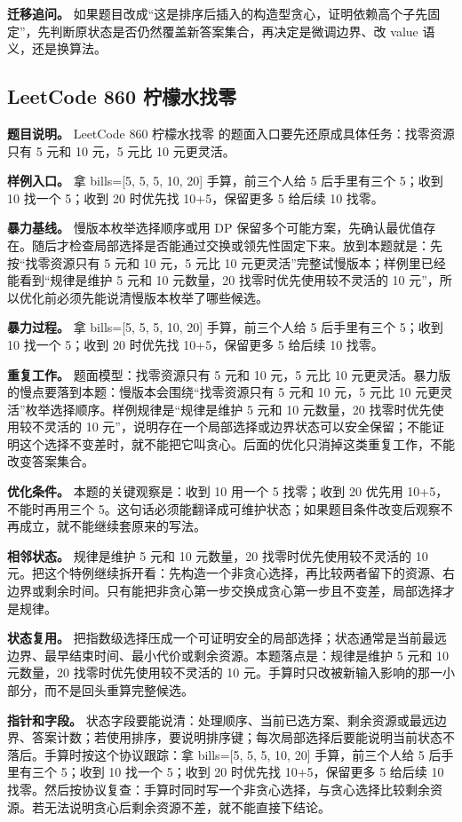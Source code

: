 \textbf{迁移追问。} 如果题目改成“这是排序后插入的构造型贪心，证明依赖高个子先固定”，先判断原状态是否仍然覆盖新答案集合，再决定是微调边界、改 value 语义，还是换算法。

\subsection{LeetCode 860 柠檬水找零}

\textbf{题目说明。} LeetCode 860 柠檬水找零 的题面入口要先还原成具体任务：找零资源只有 5 元和 10 元，5 元比 10 元更灵活。

\textbf{样例入口。} 拿 bills=[5, 5, 5, 10, 20] 手算，前三个人给 5 后手里有三个 5；收到 10 找一个 5；收到 20 时优先找 10+5，保留更多 5 给后续 10 找零。

\textbf{暴力基线。} 慢版本枚举选择顺序或用 DP 保留多个可能方案，先确认最优值存在。随后才检查局部选择是否能通过交换或领先性固定下来。放到本题就是：先按“找零资源只有 5 元和 10 元，5 元比 10 元更灵活”完整试慢版本；样例里已经能看到“规律是维护 5 元和 10 元数量，20 找零时优先使用较不灵活的 10 元”，所以优化前必须先能说清慢版本枚举了哪些候选。

\textbf{暴力过程。} 拿 bills=[5, 5, 5, 10, 20] 手算，前三个人给 5 后手里有三个 5；收到 10 找一个 5；收到 20 时优先找 10+5，保留更多 5 给后续 10 找零。

\textbf{重复工作。} 题面模型：找零资源只有 5 元和 10 元，5 元比 10 元更灵活。暴力版的慢点要落到本题：慢版本会围绕“找零资源只有 5 元和 10 元，5 元比 10 元更灵活”枚举选择顺序。样例规律是“规律是维护 5 元和 10 元数量，20 找零时优先使用较不灵活的 10 元”，说明存在一个局部选择或边界状态可以安全保留；不能证明这个选择不变差时，就不能把它叫贪心。后面的优化只消掉这类重复工作，不能改变答案集合。

\textbf{优化条件。} 本题的关键观察是：收到 10 用一个 5 找零；收到 20 优先用 10+5，不能时再用三个 5。这句话必须能翻译成可维护状态；如果题目条件改变后观察不再成立，就不能继续套原来的写法。

\textbf{相邻状态。} 规律是维护 5 元和 10 元数量，20 找零时优先使用较不灵活的 10 元。把这个特例继续拆开看：先构造一个非贪心选择，再比较两者留下的资源、右边界或剩余时间。只有能把非贪心第一步交换成贪心第一步且不变差，局部选择才是规律。

\textbf{状态复用。} 把指数级选择压成一个可证明安全的局部选择；状态通常是当前最远边界、最早结束时间、最小代价或剩余资源。本题落点是：规律是维护 5 元和 10 元数量，20 找零时优先使用较不灵活的 10 元。手算时只改被新输入影响的那一小部分，而不是回头重算完整候选。

\textbf{指针和字段。} 状态字段要能说清：处理顺序、当前已选方案、剩余资源或最远边界、答案计数；若使用排序，要说明排序键；每次局部选择后要能说明当前状态不落后。手算时按这个协议跟踪：拿 bills=[5, 5, 5, 10, 20] 手算，前三个人给 5 后手里有三个 5；收到 10 找一个 5；收到 20 时优先找 10+5，保留更多 5 给后续 10 找零。然后按协议复查：手算时同时写一个非贪心选择，与贪心选择比较剩余资源。若无法说明贪心后剩余资源不差，就不能直接下结论。

